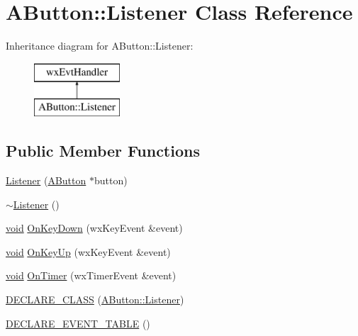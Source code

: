 \hypertarget{class_a_button_1_1_listener}{}\section{A\+Button\+:\+:Listener Class Reference}
\label{class_a_button_1_1_listener}
Inheritance diagram for A\+Button\+:\+:Listener\+:\begin{figure}[H]
\begin{center}
\leavevmode
\includegraphics[height=2.000000cm]{class_a_button_1_1_listener}
\end{center}
\end{figure}
\subsection*{Public Member Functions}
\begin{DoxyCompactItemize}
\item 
\hyperlink{class_a_button_1_1_listener_aa411f0f59b4a13e0f9515b8e97673ca5}{Listener} (\hyperlink{class_a_button}{A\+Button} $\ast$button)
\item 
\hyperlink{class_a_button_1_1_listener_a83188f0da1c74ac88dd4c0945faa0e9a}{$\sim$\+Listener} ()
\item 
\hyperlink{sound_8c_ae35f5844602719cf66324f4de2a658b3}{void} \hyperlink{class_a_button_1_1_listener_a9f5de99a2678b422dd5d755248591665}{On\+Key\+Down} (wx\+Key\+Event \&event)
\item 
\hyperlink{sound_8c_ae35f5844602719cf66324f4de2a658b3}{void} \hyperlink{class_a_button_1_1_listener_aa818663b68000aed183e7a9dfa9a8470}{On\+Key\+Up} (wx\+Key\+Event \&event)
\item 
\hyperlink{sound_8c_ae35f5844602719cf66324f4de2a658b3}{void} \hyperlink{class_a_button_1_1_listener_a0ff7371e7eb2ddc795b28b129a07df9a}{On\+Timer} (wx\+Timer\+Event \&event)
\item 
\hyperlink{class_a_button_1_1_listener_aa05d058676a70e51ae7affe10758b30c}{D\+E\+C\+L\+A\+R\+E\+\_\+\+C\+L\+A\+SS} (\hyperlink{class_a_button_1_1_listener}{A\+Button\+::\+Listener})
\item 
\hyperlink{class_a_button_1_1_listener_a615e46da13fcc5dfb047d91923ec6716}{D\+E\+C\+L\+A\+R\+E\+\_\+\+E\+V\+E\+N\+T\+\_\+\+T\+A\+B\+LE} ()
\end{DoxyCompactItemize}


